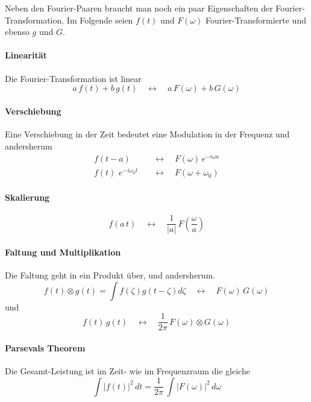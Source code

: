 Neben den Fourier-Paaren braucht man noch ein paar Eigenschaften der Fourier-Transformation. Im Folgende seien  $f(t)$ und $F(\omega)$ Fourier-Transformierte  und ebenso $g$ und $G$.

\paragraph{Linearität} Die Fourier-Transformation ist linear
\begin{equation}
a \, f(t) + b \, g(t) \quad \leftrightarrow \quad 
a \, F(\omega) + b \, G(\omega) 
\end{equation}

\paragraph{Verschiebung}  Eine Verschiebung in der Zeit bedeutet eine Modulation in der Frequenz und andersherum
\begin{align}
 f(t - a) & \quad \leftrightarrow \quad 
F(\omega) \, e^{-i \omega a} \\
 f(t) \, \, e^{-i \omega_0 t} &  \quad \leftrightarrow \quad 
F(\omega + \omega_0)  
\end{align}

\paragraph{Skalierung}  
\begin{equation}
 f( a \, t)  \quad \leftrightarrow \quad 
\frac{1}{|a|} \, F \left( \frac{\omega}{a} \right)  
\end{equation}


\paragraph{Faltung und Multiplikation} Die Faltung geht in ein Produkt über, und andersherum.
\begin{equation}
 f(t) \otimes g(t) = \int f(\zeta) g(t- \zeta) d\zeta 
 \quad \leftrightarrow \quad 
 F(\omega) \, G(\omega)
\end{equation}
und
\begin{equation}
 f(t) \,  g(t) 
 \quad \leftrightarrow \quad 
\frac{1}{2 \pi} \,  F(\omega) \otimes G(\omega)
\end{equation}

\paragraph{Parsevals Theorem} Die Gesamt-Leistung ist im Zeit- wie im Frequenzraum die gleiche
\begin{equation}
 \int |f(t) |^2 \, dt = \frac{1}{2 \pi} \, \int | F (\omega ) | ^2 \, d\omega
\end{equation}

